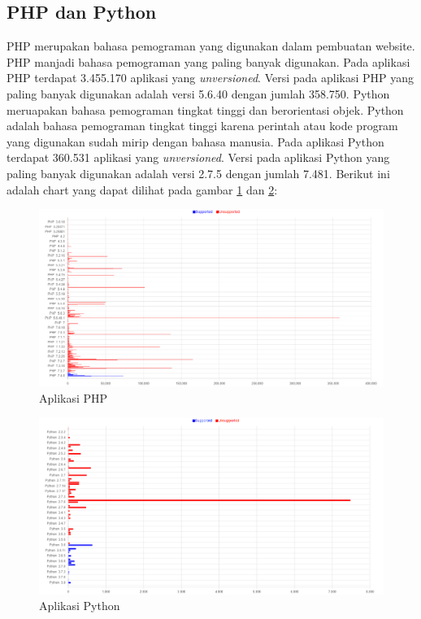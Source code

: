 \subsection{PHP dan Python}
PHP merupakan bahasa pemograman yang digunakan dalam pembuatan website. PHP manjadi bahasa pemograman yang paling banyak digunakan. Pada aplikasi PHP terdapat 3.455.170 aplikasi yang \textit{unversioned}. Versi pada aplikasi PHP yang paling banyak digunakan adalah versi 5.6.40 dengan jumlah 358.750.
Python meruapakan bahasa pemograman tingkat tinggi dan berorientasi objek. Python adalah bahasa pemograman tingkat tinggi karena perintah atau kode program yang digunakan sudah mirip dengan bahasa manusia. Pada aplikasi Python terdapat 360.531 aplikasi yang \textit{unversioned}. Versi pada aplikasi Python yang paling banyak digunakan adalah versi 2.7.5 dengan jumlah 7.481. Berikut ini adalah chart yang dapat dilihat pada gambar \ref{fig:data_sample_php} dan \ref{fig:data_sample_python}:
\begin{figure}[H]
	\centering  
	\includegraphics[scale=0.5]{Gambar/hasil_chart_php.png}  
	\caption{Aplikasi PHP} 
	\label{fig:data_sample_php} 
\end{figure}

\begin{figure}[H]
	\centering  
	\includegraphics[scale=0.5]{Gambar/hasil_chart_python.png}  
	\caption{Aplikasi Python} 
	\label{fig:data_sample_python} 
\end{figure}

